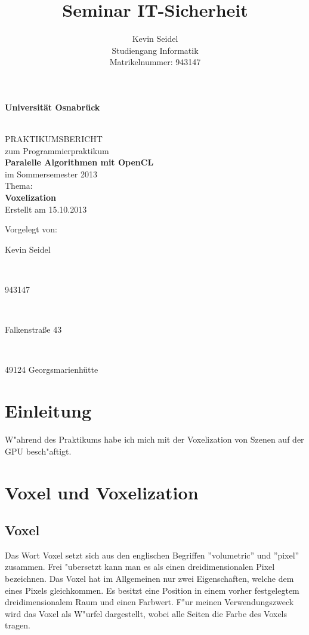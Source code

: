 \documentclass[a4paper, 12pt]{scrartcl}
\title{Seminar IT-Sicherheit}
\author{Kevin Seidel \\ Studiengang Informatik \\ Matrikelnummer: 943147}
\begin{document}
\begin{titlepage}
\begin{center}
\vspace*{1.5cm}
\begin{Large}
\textbf{Universität Osnabrück}
\end{Large}

\noindent\hrulefill
\\[3.5cm]
PRAKTIKUMSBERICHT \\[1cm]
zum Programmierpraktikum \\[1cm]
\textbf{Paralelle Algorithmen mit OpenCL} \\[1.5cm]
im Sommersemester 2013 \\[1.5cm]
Thema: \\[0.5cm]
\textbf{Voxelization} \\[2cm]
Erstellt am 15.10.2013
\end{center}
\vfill
\begin{flushleft}
Vorgelegt von: 
\hfill \parbox{46mm}{Kevin Seidel} \\
\hfill \parbox{46mm}{943147} \\
\hfill \parbox{46mm}{Falkenstraße 43} \\
\hfill \parbox{46mm}{49124 Georgsmarienhütte}
\end{flushleft}
\end{titlepage}

\newpage

\setcounter{page}{2}
\tableofcontents

\newpage
{}
\setcounter{page}{1}

\section{Einleitung}
W"ahrend des Praktikums habe ich mich mit der Voxelization von Szenen auf der GPU besch"aftigt. 

\section{Voxel und Voxelization}
\subsection{Voxel}
Das Wort Voxel setzt sich aus den englischen Begriffen ''volumetric'' und ''pixel'' zusammen. Frei "ubersetzt kann man es als einen dreidimensionalen Pixel bezeichnen.
Das Voxel hat im Allgemeinen nur zwei Eigenschaften, welche dem eines Pixels gleichkommen. Es besitzt eine Position in einem vorher festgelegtem dreidimensionalem Raum und einen Farbwert.
F"ur meinen Verwendungszweck wird das Voxel als W"urfel dargestellt, wobei alle Seiten die Farbe des Voxels tragen.
\end{document}
